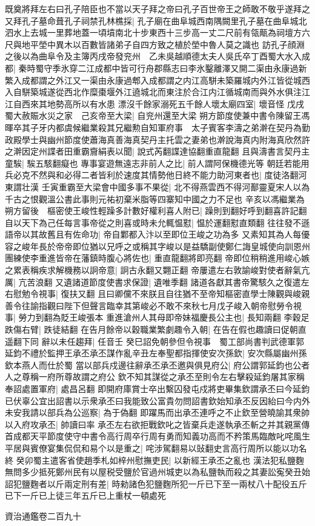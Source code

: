 既奠將拜左右曰孔子陪臣也不當以天子拜之帝曰孔子百世帝王之師敢不敬乎遂拜之又拜孔子墓命葺孔子祠禁孔林樵採|{
	孔子廟在曲阜城西南隅闕里孔子墓在曲阜城北泗水上去城一里葬地蓋一頃墳南北十步東西十三步高一丈二尺前有瓴甋為祠壇方六尺與地平塋中異木以百數皆諸弟子自四方致之植於塋中魯人莫之識也}
訪孔子顔淵之後以為曲阜令及主簿丙戌帝發兖州　乙未吳越順德太夫人吳氏卒丁酉蜀大水入成都|{
	秦時蜀守季氷穿二江成都中皆可行舟郡縣志曰李氷鑿離澤又開二渠由永康過新繁入成都謂之外江又一渠由永康過郫入成都謂之内江高駢未築羅城内外江皆從城西入自駢築城遂從西北作糜棗堰外江遶城北而東注於合江内江循城南而與外水俱注江江自西來其地勢高所以有水患}
漂沒千餘家溺死五千餘人壞太廟四室|{
	壞音怪}
戊戌蜀大赦賑水災之家　己亥帝至大梁|{
	自兖州還至大梁}
朔方節度使兼中書令陳留王馮暉卒其子牙内都虞候繼業殺其兄繼勲自知軍府事　太子賓客李濤之弟澣在契丹為勤政殿學士與幽州節度使蕭海真善海真契丹主托雲之妻弟也澣說海真内附海真欣然許之澣因定州諜者田重霸齎絹表以聞|{
	說式芮翻諜達協翻重直龍翻}
且與濤書言契丹主童騃|{
	騃五駭翻癡也}
專事宴遊無遠志非前人之比|{
	前人謂阿保機德光等}
朝廷若能用兵必克不然與和必得二者皆利於速度其情勢他日終不能力助河東者也|{
	度徒洛翻河東謂壮漢}
壬寅重霸至大梁會中國多事不果從|{
	北不得燕雲西不得河鄯靈夏宋人以為千古之恨觀溫公書此事則元祐初棄米脂等四寨知中國之力不足也}
辛亥以馮繼業為朔方留後　樞密使王峻性輕躁多計數好權利喜人附已|{
	躁則到翻好呼到翻喜許記翻}
自以天下為己任每言事帝從之則喜或時未允輒愠懟|{
	愠於運翻懟直類翻}
往往發不遜語帝以其故舊且有佐命功|{
	帝自鄴都入汴以至即位王峻之功為多}
又素知其為人每優容之峻年長於帝帝即位猶以兄呼之或稱其字峻以是益驕副使鄭仁誨皇城使向訓恩州團練使李重進皆帝在藩鎮時腹心將佐也|{
	重直龍翻將即亮翻}
帝即位稍稍進用峻心嫉之累表稱疾求解機務以詗帝意|{
	詗古永翻又翾正翻}
帝屢遣左右敦諭峻對使者辭氣亢厲|{
	亢苦浪翻}
又遺諸道節度使書求保證|{
	遺唯季翻}
諸道各獻其書帝驚駭久之復遣左右慰勉令視事|{
	復扶又翻}
且曰卿儻不來朕且自往猶不至帝知樞密直學士陳觀與峻親善令往諭指觀曰陛下但聲言臨幸其第峻必不敢不來秋七月戊子峻入朝帝慰勞令視事|{
	勞力到翻為貶王峻張本}
重進滄州人其母即帝妹福慶長公主也|{
	長知兩翻}
李穀足跌傷右臂|{
	跌徒結翻}
在告月餘帝以穀職業繁劇趣令入朝|{
	在告在假也趣讀曰促朝直遥翻下同}
辭以未任趨拜|{
	任音壬}
癸巳詔免朝參但令視事　蜀工部尚書判武德軍郭延鈞不禮於監押王承丕承丕謀作亂辛丑左奉聖都指揮使安次孫欽|{
	安次縣屬幽州孫欽本燕人而仕於蜀}
當以部兵戍邊往辭承丕承丕邀與俱見府公|{
	府公謂郭延鈞也公者人之尊稱一府所尊故謂之府公}
欽不知其謀從之承丕至則令左右擊殺延鈞屠其家稱奉詔處置軍府|{
	處昌呂翻}
即開府庫賞士卒出繫囚發屯戍將吏畢集欽謂承丕曰今延鈞已伏辜公宜出詔書以示衆承丕曰我能致公富貴勿問詔書欽始知承丕反因紿曰今内外未安我請以部兵為公巡察|{
	為于偽翻}
即躍馬而出承丕連呼之不止欽至營曉諭其衆帥以入府攻承丕|{
	帥讀曰率}
承丕左右欲拒戰欽叱之皆棄兵走遂執承丕斬之并其親黨傳首成都天平節度使守中書令高行周卒行周有勇而知義功高而不矜策馬臨敵叱咤風生平居與賓僚宴集侃侃和易个以是重之|{
	咤涉駕翻易以䜴翻史言高行周所以能以功名終}
癸卯蜀主遣客省使趙季札如梓州慰撫吏民|{
	以新經王承丕之亂也}
漢法犯私鹽麴無問多少抵死鄭州民有以屋税受鹽於官過州城吏以為私鹽執而殺之其妻訟寃癸丑始詔犯鹽麴者以斤兩定刑有差|{
	時勑諸色犯鹽麴所犯一斤已下至一兩杖八十配役五斤已下一斤已上徒三年五斤已上重杖一頓處死}


資治通鑑卷二百九十
